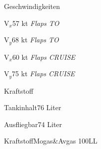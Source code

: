 \begin{task}
  \begin{checklist}{Geschwindigkeiten}
    \item{V$_{x}$}{57 kt \textit{Flaps TO}}
    \item{V$_{y}$}{68 kt \textit{Flaps TO}}
    \item{V$_{x}$}{60 kt \textit{Flaps CRUISE}}
    \item{V$_{y}$}{75 kt \textit{Flaps CRUISE}}
  \end{checklist}
  \begin{checklist}{Kraftstoff}
    \item{Tankinhalt}{76 Liter}
    \item{Ausfliegbar}{74 Liter}
    \item{Kraftstoff}{Mogas\&Avgas 100LL}
  \end{checklist}
\end{task}






